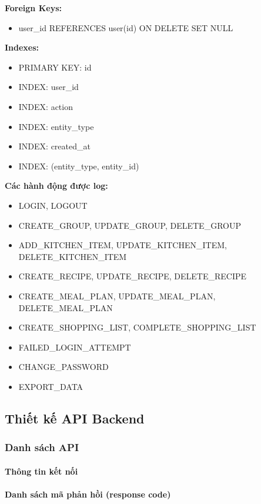 \textbf{Foreign Keys:}
\begin{itemize}
    \item user\_id REFERENCES user(id) ON DELETE SET NULL
\end{itemize}

\textbf{Indexes:}
\begin{itemize}
    \item PRIMARY KEY: id
    \item INDEX: user\_id
    \item INDEX: action
    \item INDEX: entity\_type
    \item INDEX: created\_at
    \item INDEX: (entity\_type, entity\_id)
\end{itemize}

\textbf{Các hành động được log:}
\begin{itemize}
    \item LOGIN, LOGOUT
    \item CREATE\_GROUP, UPDATE\_GROUP, DELETE\_GROUP
    \item ADD\_KITCHEN\_ITEM, UPDATE\_KITCHEN\_ITEM, DELETE\_KITCHEN\_ITEM
    \item CREATE\_RECIPE, UPDATE\_RECIPE, DELETE\_RECIPE
    \item CREATE\_MEAL\_PLAN, UPDATE\_MEAL\_PLAN, DELETE\_MEAL\_PLAN
    \item CREATE\_SHOPPING\_LIST, COMPLETE\_SHOPPING\_LIST
    \item FAILED\_LOGIN\_ATTEMPT
    \item CHANGE\_PASSWORD
    \item EXPORT\_DATA
\end{itemize}

\subsection{Thiết kế API Backend}
\subsubsection{Danh sách API}
\paragraph{Thông tin kết nối}
\paragraph{Danh sách mã phản hồi (response code)}


